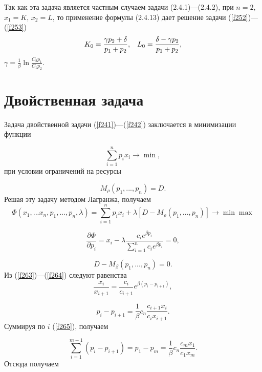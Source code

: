 \documentclass[12pt,openbib]{report}
\begin{document}
Так как эта задача является частным случаем задачи (2.4.1)---(2.4.2), при $n=2$, $x_1=K$, $x_2=L$,
то применение формулы (2.4.13) дает решение задачи (\ref{f252})---(\ref{f253})
\begin{equation}\label{f254}
K_0=\frac{\gamma p_2+\delta}{p_1+p_2},\hspace{3mm}L_0=\frac{\delta-\gamma p_2}{p_1+p_2},
\end{equation}
$\gamma=\frac1\beta\ln\frac{C_2p_1}{C_1p_2}$.

\section{Двойственная задача}

Задача двойственной задачи (\ref{f241})---(\ref{f242}) заключается в минимизации функции

\begin{equation}\label{f261}
\sum_{i=1}^{n}p_{i}x_{i}\rightarrow\min,
\end{equation}
при условии ограничений на ресурсы

\begin{equation}\label{f262}
M_{\rho}(p_1,...,p_n)=D.
\end{equation}
Решая эту задачу методом Лагранжа, получаем
$$\Phi(x_1,...x_n,p_1,...,p_n,\lambda)=\sum_{i=1}^{n}p_ix_i+\lambda[D-
M_{\rho}(p_1,...,p_n)]\rightarrow \min\max$$

\begin{equation}\label{f263}
\frac{ \partial\Phi}{\partial p_i}=x_i-\lambda\frac{c_i e^{\beta p_i}}{\sum _{i=1}^{n}c_i e^{\beta p_i}}=0,
\end{equation}

\begin{equation}\label{f264}
D-M_\beta(p_1,...,p_n)=0.
\end{equation}
Из (\ref{f263})---(\ref{f264}) следуют равенства
$$\frac{x_i}{x_{i+1}}=\frac{c_i}{c_{i+1}}e^{\beta(p_i-p_{i+1})},$$

\begin{equation}\label{f265}
p_i-p_{i+1}=\frac{1}{\beta}c_n\frac{c_{i+1}x_i}{c_ix_{i+1}}.
\end{equation}
Суммируя по $i$ (\ref{f265}), получаем

\begin{equation}\label{f266}
\sum_{i=1}^{m-1}(p_i-p_{i+1})=p_1-p_m=\frac{1}{\beta}c_n\frac{c_m x_1}{c_1x_m}.
\end{equation}
Отсюда получаем
\end{document}
